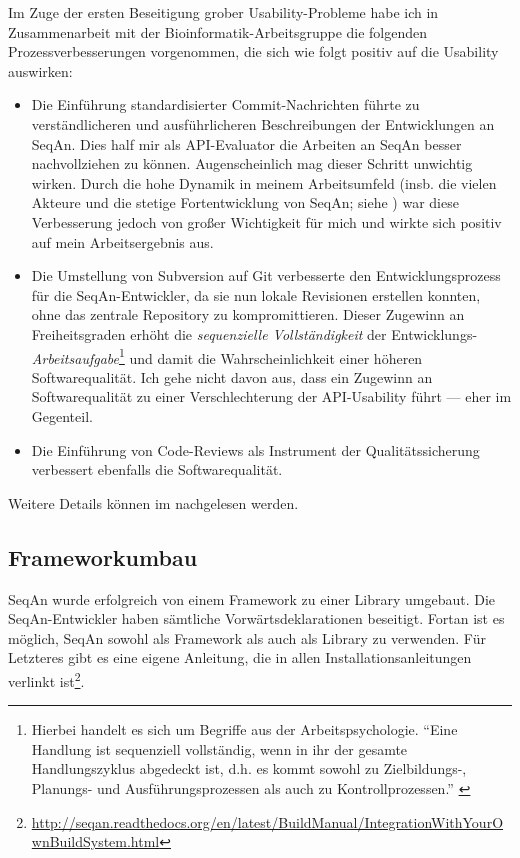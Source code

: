 Im Zuge der ersten Beseitigung grober Usability-Probleme habe ich in Zusammenarbeit mit der Bioinformatik-Arbeitsgruppe die folgenden Prozessverbesserungen vorgenommen, die sich wie folgt positiv auf die Usability auswirken:
\begin{itemize}
  \item Die Einführung standardisierter Commit-Nachrichten führte zu verständlicheren und ausführlicheren Beschreibungen der Entwicklungen an SeqAn. Dies half mir als API-Evaluator die Arbeiten an SeqAn besser nachvollziehen zu können. Augenscheinlich mag dieser Schritt unwichtig wirken. Durch die hohe Dynamik in meinem Arbeitsumfeld (insb. die vielen Akteure und die stetige Fortentwicklung von SeqAn; siehe ) war diese Verbesserung jedoch von großer Wichtigkeit für mich und wirkte sich positiv auf mein Arbeitsergebnis aus.
  \item Die Umstellung von Subversion auf Git verbesserte den Entwicklungsprozess für die SeqAn-Entwickler, da sie nun lokale Revisionen erstellen konnten, ohne das zentrale Repository zu kompromittieren. Dieser Zugewinn an Freiheitsgraden erhöht die \textit{sequenzielle Vollständigkeit} der Entwicklungs-\textit{Arbeitsaufgabe}\footnote{Hierbei handelt es sich um Begriffe aus der Arbeitspsychologie. ``Eine Handlung ist sequenziell vollständig, wenn in ihr der gesamte Handlungszyklus abgedeckt ist, d.h. es kommt sowohl zu Zielbildungs-, Planungs- und Ausführungsprozessen als auch zu Kontrollprozessen.'' \citep{Bamberg:2011tv}} und damit die Wahrscheinlichkeit einer höheren Softwarequalität. Ich gehe nicht davon aus, dass ein Zugewinn an Softwarequalität zu einer Verschlechterung der API-Usability führt --- eher im Gegenteil.
  \item Die Einführung von Code-Reviews als Instrument der Qualitätssicherung verbessert ebenfalls die Softwarequalität.
\end{itemize}

Weitere Details können im  nachgelesen werden.



\subsection{Frameworkumbau}

SeqAn wurde erfolgreich von einem Framework zu einer Library umgebaut. Die SeqAn-Entwickler haben sämtliche Vorwärtsdeklarationen beseitigt. Fortan ist es möglich, SeqAn sowohl als Framework als auch als Library zu verwenden. Für Letzteres gibt es eine eigene Anleitung, die in allen Installationsanleitungen verlinkt ist\footnote{\url{http://seqan.readthedocs.org/en/latest/BuildManual/IntegrationWithYourOwnBuildSystem.html}}.

